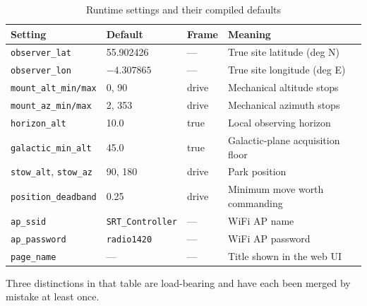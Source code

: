 \documentclass[11pt,a4paper]{article}
\begin{document}
\begin{table}[H]
\centering
\caption{Runtime settings and their compiled defaults}
\label{tab:esp-settings}
\footnotesize
\begin{tabular}{lllp{6.0cm}}
\toprule
\textbf{Setting} & \textbf{Default} & \textbf{Frame} & \textbf{Meaning} \\
\midrule
\texttt{observer\_lat} & 55.902426 & --- & True site latitude (deg N) \\
\texttt{observer\_lon} & $-4.307865$ & --- & True site longitude (deg E) \\
\texttt{mount\_alt\_min/max} & 0, 90 & drive & Mechanical altitude stops \\
\texttt{mount\_az\_min/max} & 2, 353 & drive & Mechanical azimuth stops \\
\texttt{horizon\_alt} & 10.0 & true & Local observing horizon \\
\texttt{galactic\_min\_alt} & 45.0 & true & Galactic-plane acquisition floor \\
\texttt{stow\_alt}, \texttt{stow\_az} & 90, 180 & drive & Park position \\
\texttt{position\_deadband} & 0.25 & drive & Minimum move worth commanding\index{deadband} \\
\texttt{ap\_ssid} & \texttt{SRT\_Controller} & --- & WiFi AP name \\
\texttt{ap\_password} & \texttt{radio1420} & --- & WiFi AP password \\
\texttt{page\_name} & --- & --- & Title shown in the web UI \\
\bottomrule
\end{tabular}
\end{table}

Three distinctions in that table are load-bearing and have each been merged by mistake at least once.
\end{document}
